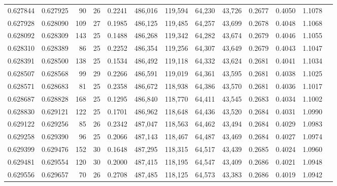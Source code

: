 \begin{tabular}{rrrrrrrrrrrrr}
0.627844 & 0.627925 &    90 &  26 &                                     0.2241 & 486,016 & 119,594 &  64,230 &  43,726 & 0.2677 & 0.4050 & 1.1078 \\
0.627928 & 0.628090 &   109 &  27 &                                     0.1985 & 486,125 & 119,485 &  64,257 &  43,699 & 0.2678 & 0.4048 & 1.1068 \\
0.628092 & 0.628309 &   143 &  25 &                                     0.1488 & 486,268 & 119,342 &  64,282 &  43,674 & 0.2679 & 0.4046 & 1.1055 \\
0.628310 & 0.628389 &    86 &  25 &                                     0.2252 & 486,354 & 119,256 &  64,307 &  43,649 & 0.2679 & 0.4043 & 1.1047 \\
0.628391 & 0.628500 &   138 &  25 &                                     0.1534 & 486,492 & 119,118 &  64,332 &  43,624 & 0.2681 & 0.4041 & 1.1034 \\
0.628507 & 0.628568 &    99 &  29 &                                     0.2266 & 486,591 & 119,019 &  64,361 &  43,595 & 0.2681 & 0.4038 & 1.1025 \\
0.628571 & 0.628683 &    81 &  25 &                                     0.2358 & 486,672 & 118,938 &  64,386 &  43,570 & 0.2681 & 0.4036 & 1.1017 \\
0.628687 & 0.628828 &   168 &  25 &                                     0.1295 & 486,840 & 118,770 &  64,411 &  43,545 & 0.2683 & 0.4034 & 1.1002 \\
0.628830 & 0.629121 &   122 &  25 &                                     0.1701 & 486,962 & 118,648 &  64,436 &  43,520 & 0.2684 & 0.4031 & 1.0990 \\
0.629122 & 0.629256 &    85 &  26 &                                     0.2342 & 487,047 & 118,563 &  64,462 &  43,494 & 0.2684 & 0.4029 & 1.0983 \\
0.629258 & 0.629390 &    96 &  25 &                                     0.2066 & 487,143 & 118,467 &  64,487 &  43,469 & 0.2684 & 0.4027 & 1.0974 \\
0.629399 & 0.629476 &   152 &  30 &                                     0.1648 & 487,295 & 118,315 &  64,517 &  43,439 & 0.2685 & 0.4024 & 1.0960 \\
0.629481 & 0.629554 &   120 &  30 &                                     0.2000 & 487,415 & 118,195 &  64,547 &  43,409 & 0.2686 & 0.4021 & 1.0948 \\
0.629556 & 0.629657 &    70 &  26 &                                     0.2708 & 487,485 & 118,125 &  64,573 &  43,383 & 0.2686 & 0.4019 & 1.0942 \\

\end{tabular}
